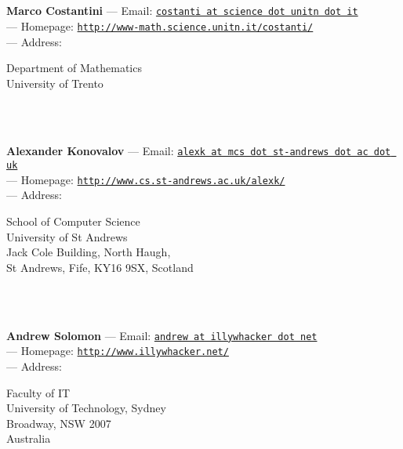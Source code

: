 \documentclass[a4paper,11pt]{report}
\begin{document}
\begin{titlepage}
\mbox{}\\
{\mbox{}\\
\small \noindent \textbf{Marco Costantini    } --- Email: \href{mailto://costanti at science dot unitn dot it} {\texttt{costanti at science dot unitn dot it}}\\
 --- Homepage: \href{http://www-math.science.unitn.it/~costanti/} {\texttt{http://www-math.science.unitn.it/\texttt{}costanti/}}\\
 --- Address: \begin{minipage}[t]{8cm}\noindent
 Department of Mathematics\\
 University of Trento\\
 \end{minipage}
}\\
{\mbox{}\\
\small \noindent \textbf{Alexander Konovalov    } --- Email: \href{mailto://alexk at mcs dot st-andrews dot ac dot uk} {\texttt{alexk at mcs dot st-andrews dot ac dot uk}}\\
 --- Homepage: \href{http://www.cs.st-andrews.ac.uk/~alexk/} {\texttt{http://www.cs.st-andrews.ac.uk/\texttt{}alexk/}}\\
 --- Address: \begin{minipage}[t]{8cm}\noindent
 School of Computer Science\\
 University of St Andrews\\
 Jack Cole Building, North Haugh,\\
 St Andrews, Fife, KY16 9SX, Scotland\\
 \end{minipage}
}\\
{\mbox{}\\
\small \noindent \textbf{Andrew Solomon    } --- Email: \href{mailto://andrew at illywhacker dot net} {\texttt{andrew at illywhacker dot net}}\\
 --- Homepage: \href{http://www.illywhacker.net/} {\texttt{http://www.illywhacker.net/}}\\
 --- Address: \begin{minipage}[t]{8cm}\noindent
 Faculty of IT\\
 University of Technology, Sydney\\
 Broadway, NSW 2007\\
 Australia\\
 \end{minipage}
}\\
\end{titlepage}
\end{document}
